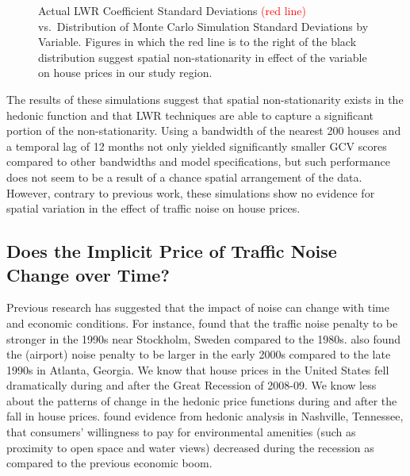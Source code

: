 \documentclass{article}\usepackage{graphicx, color}
\begin{document}
\begin{figure}
 \caption{Actual LWR Coefficient Standard Deviations \textcolor{red}{(red line)} vs.\ Distribution of Monte Carlo Simulation Standard Deviations by Variable. Figures in which the red line is to the right of the black distribution suggest spatial non-stationarity in effect of the variable on house prices in our study region.}\label{fig:MCsds}
\end{figure}

The results of these simulations suggest that spatial non-stationarity exists in the hedonic function and that LWR techniques are able to capture a significant portion of the non-stationarity. Using a bandwidth of the nearest 200 houses and a temporal lag of 12 months not only yielded significantly smaller GCV scores compared to other bandwidths and model specifications, but such performance does not seem to be a result of a chance spatial arrangement of the data. However, contrary to previous work, these simulations show no evidence for spatial variation in the effect of traffic noise on house prices.

\subsection{Does the Implicit Price of Traffic Noise Change over Time?}

Previous research has suggested that the impact of noise can change with time and economic conditions. For instance, \citet{Wilhelmsson2000} found that the traffic noise penalty to be stronger in the 1990s near Stockholm, Sweden compared to the 1980s. \citet{Cohen2009} also found the (airport) noise penalty to be larger in the early 2000s compared to the late 1990s in Atlanta, Georgia. We know that house prices in the United States fell dramatically during and after the Great Recession of 2008-09. We know less about the patterns of change in the hedonic price functions during and after the fall in house prices. \citet{Cho2011b} found evidence from hedonic analysis in Nashville, Tennessee,  that consumers' willingness to pay for environmental amenities (such as proximity to open space and water views) decreased during the recession as compared to the previous economic boom. 
\end{document}
